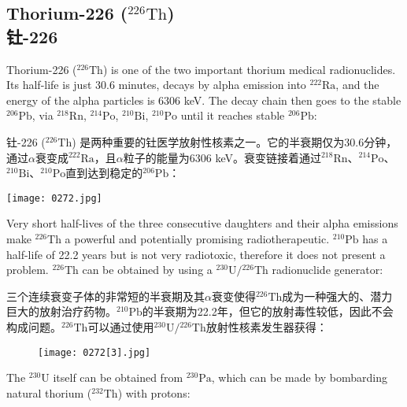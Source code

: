 \documentclass[dvipsnames, svgnames,a4paper,11pt]{article}
\begin{document}
\subsection{Thorium-226 (\(\mathrm{^{226}Th}\)) \\钍-226}  
Thorium-226 (\(\mathrm{^{226}Th}\)) is one of the two important thorium medical radionuclides. Its half-life is just 30.6 minutes, decays by alpha emission into \(\mathrm{^{222}Ra}\), and the energy of the alpha particles is 6306 keV. The decay chain then goes to the stable \(\mathrm{^{206}Pb}\), via \(\mathrm{^{218}Rn}\), \(\mathrm{^{214}Po}\), \(\mathrm{^{210}Bi}\), \(\mathrm{^{210}Po}\) until it reaches stable \(\mathrm{^{206}Pb}\):  

钍-226 (\(\mathrm{^{226}Th}\)) 是两种重要的钍医学放射性核素之一。它的半衰期仅为30.6分钟，通过$\alpha$衰变成\(\mathrm{^{222}Ra}\)，且$\alpha$粒子的能量为6306 keV。衰变链接着通过\(\mathrm{^{218}Rn}\)、\(\mathrm{^{214}Po}\)、\(\mathrm{^{210}Bi}\)、\(\mathrm{^{210}Po}\)直到达到稳定的\(\mathrm{^{206}Pb}\)：  

\begin{figure*}[h]
	\centering
    \texttt{[image: 0272.jpg]}  
\end{figure*}

Very short half-lives of the three consecutive daughters and their alpha emissions make \(\mathrm{^{226}Th}\) a powerful and potentially promising radiotherapeutic. \(\mathrm{^{210}Pb}\) has a half-life of 22.2 years but is not very radiotoxic, therefore it does not present a problem. \(\mathrm{^{226}Th}\) can be obtained by using a \(\mathrm{^{230}U}/\mathrm{^{226}Th}\) radionuclide generator:  

三个连续衰变子体的非常短的半衰期及其$\alpha$衰变使得\(\mathrm{^{226}Th}\)成为一种强大的、潜力巨大的放射治疗药物。\(\mathrm{^{210}Pb}\)的半衰期为22.2年，但它的放射毒性较低，因此不会构成问题。\(\mathrm{^{226}Th}\)可以通过使用\(\mathrm{^{230}U}/\mathrm{^{226}Th}\)放射性核素发生器获得：  

\begin{figure}[h]
	\centering
    \texttt{[image: 0272[3].jpg]}  
     \label{fig368}
\end{figure}

The \(\mathrm{^{230}U}\) itself can be obtained from \(\mathrm{^{230}Pa}\), which can be made by bombarding natural thorium (\(\mathrm{^{232}Th}\)) with protons:  
\end{document}
